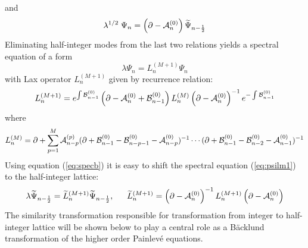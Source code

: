 \documentclass[12pt]{article}
\numberwithin{equation}{section}
\def\rf#1{(\ref{eq:#1})}
\def\lab#1{\label{eq:#1}}
\begin{document}
and
\begin{equation}
\lambda^{1/2}\; \Psi_{n}= \left( \partial - {\cal A}^{(0)}_n \right) 
{\widetilde \Psi}_{n-\frac12}
\lab{specb}
\end{equation}
Eliminating half-integer modes from the last two relations 
yields a spectral equation of  a form 
\begin{equation}
 \lambda \Psi_n =L^{(M+1)}_n
\Psi_{n}
\lab{psilm1}
\end{equation}
with Lax operator $L^{(M+1)}_n$
given by recurrence relation:
\begin{equation}
L^{(M+1)}_n = e^{\int {\cal B}^{(0)}_{n-1}} \left( \partial - {\cal A}^{(0)}_n +{\cal B}^{(0)}_{n-1}\right)
L^{(M)}_n \left( \partial - {\cal A}^{(0)}_n \right)^{-1} e^{-\int {\cal B}^{(0)}_{n-1}}
\lab{recu}
\end{equation}
where
\begin{equation}
L^{(M)}_n=  \partial  + \sum_{p=1}^M
{\cal A}^{(p)}_{n-p} ( \partial + {\cal B}^{(0)}_{n-1}- {\cal B}^{(0)}_{n-p-1} -
{\cal A}^{(0)}_{n-p} )^{-1}
\cdots ( \partial + {\cal B}^{(0)}_{n-1}-{\cal B}^{(0)}_{n-2} - {\cal A}^{(0)}_{n-1} )^{-1}
\lab{laxMn}
\end{equation}
Using equation \rf{specb} it is easy to shift the spectral
equation \rf{psilm1} to the half-integer lattice:
\begin{equation}
\lambda {\widetilde \Psi}_{n-\frac12}
= {\widetilde L}^{(M+1)}_n {\widetilde \Psi}_{n-\frac12}, \quad \;\;
{\widetilde L}^{(M+1)}_n = \left( \partial - {\cal A}^{(0)}_n \right)^{-1}
L^{(M+1)}_n \left( \partial - {\cal A}^{(0)}_n \right) 
\lab{backpsilm1}
\end{equation}
The similarity transformation responsible for 
transformation from integer to half-integer lattice will
be shown below to play a central role as a B\"acklund transformation
of the higher order Painlev\'e equations.
\end{document}
